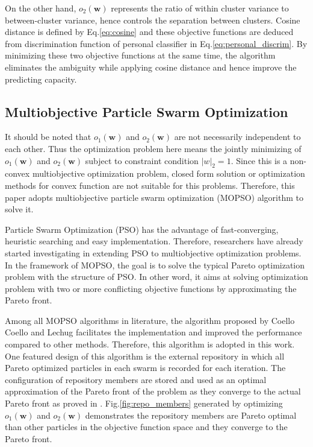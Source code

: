 On the other hand, $o_2(\mathbf{w})$ represents the ratio of within cluster variance to between-cluster variance, hence controls the separation between clusters. Cosine distance is defined by Eq.\ref{eq:cosine} and these objective functions are deduced from discrimination function of personal classifier in Eq.\ref{eq:personal_discrim}. By minimizing these two objective functions at the same time, the algorithm eliminates the ambiguity while applying cosine distance and hence improve the predicting capacity.

\subsection{Multiobjective Particle Swarm Optimization}

It should be noted that $o_1(\mathbf{w}) $ and $o_2(\mathbf{w})$ are not necessarily independent to each other. Thus the optimization problem here means the jointly minimizing of $o_1(\mathbf{w}) $ and $o_2(\mathbf{w})$ subject to constraint condition $|w|_2=1$. Since this is a non-convex multiobjective optimization problem, closed form solution or optimization methods for convex function are not suitable for this problems. Therefore, this paper adopts multiobjective particle swarm optimization (MOPSO) algorithm to solve it.

Particle Swarm Optimization (PSO) has the advantage of fast-converging, heuristic searching and easy implementation\cite{coello2002mopso, alvarez2005mopso}. Therefore, researchers have already started investigating in extending PSO to multiobjective optimization problems. In the framework of MOPSO, the goal is to solve the typical Pareto optimization problem with the structure of PSO. In other word, it aims at solving optimization problem with two or more conflicting objective functions by approximating the Pareto front. 


Among all MOPSO algorithms in literature, the algorithm proposed by Coello Coello and Lechug facilitates the implementation and improved the performance compared to other methods\cite{coello2002mopso}. Therefore,  this algorithm is adopted in this work. One featured design of this algorithm is the external repository in which all Pareto optimized particles in each swarm is recorded for each iteration. The configuration of repository members are stored and used as an optimal approximation of the Pareto front of the problem as they converge to the actual Pareto front as proved in \cite{coello2002mopso}. Fig.\ref{fig:repo_members} generated by optimizing $o_1(\mathbf{w}) $ and $o_2(\mathbf{w})$ demonstrates the repository members are Pareto optimal than other particles in the objective function space and they converge to the Pareto front.

